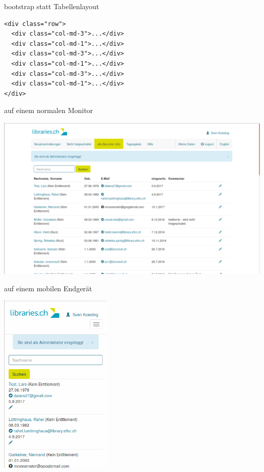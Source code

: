 \begin{frame}[fragile]{bootstrap statt Tabellenlayout}
  \selectfont
  \begin{lstlisting}
<div class="row">
  <div class="col-md-3">...</div>
  <div class="col-md-1">...</div>
  <div class="col-md-3">...</div>
  <div class="col-md-1">...</div>
  <div class="col-md-3">...</div>
  <div class="col-md-1">...</div>
</div>
  \end{lstlisting}
\end{frame}

\begin{frame}{auf einem normalen Monitor}
  \begin{center}
    \includegraphics[width=1\textwidth]{pics/bootstrap-normal}
  \end{center}
\end{frame}

\begin{frame}{auf einem mobilen Endgerät}
  \begin{center}
    \includegraphics[width=0.4\textwidth]{pics/bootstrap-mobile}
  \end{center}
\end{frame}

